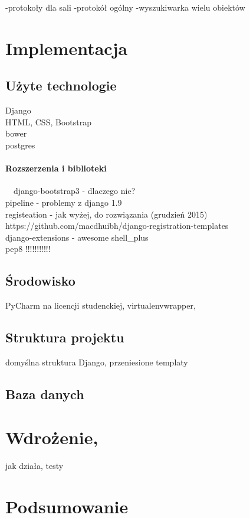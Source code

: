 \documentclass[a4paper,12pt,twoside]{article}
\begin{document}
-protokoły dla sali
-protokół ogólny
-wyszukiwarka wielu obiektów

\section{Implementacja}

\subsection{Użyte technologie}

Django\\
HTML, CSS, Bootstrap\\
bower\\
postgres

\paragraph{Rozszerzenia i biblioteki}~\
django-bootstrap3 - dlaczego nie?\\
pipeline - problemy z django 1.9\\
registeation - jak wyżej, do rozwiązania (grudzień 2015)\\
https://github.com/macdhuibh/django-registration-templates\\
django-extensions - awesome shell_plus\\
pep8 !!!!!!!!!!!\\

\subsection{Środowisko}
PyCharm na licencji studenckiej, virtualenvwrapper, 

\subsection{Struktura projektu}

domyślna struktura Django, przeniesione templaty

\subsection{Baza danych}

\section{Wdrożenie, }
jak działa, testy

\section{Podsumowanie}
\end{document}
